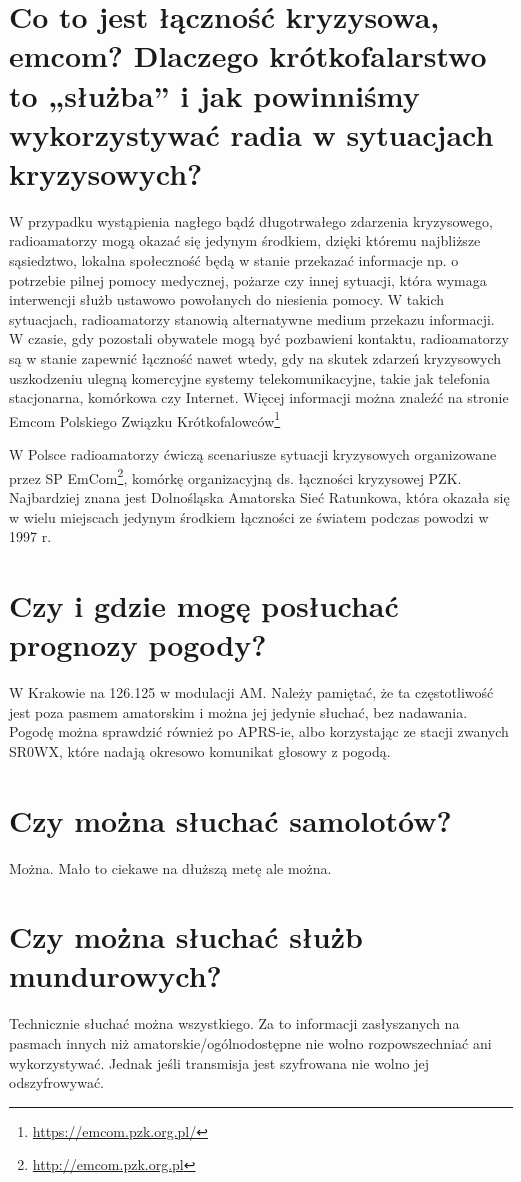 \documentclass[a4paper,12pt]{article}
\begin{document}
\section{Co to jest łączność kryzysowa, emcom? Dlaczego krótkofalarstwo to „służba” i jak powinniśmy wykorzystywać radia w sytuacjach kryzysowych?}
W przypadku wystąpienia nagłego bądź długotrwałego zdarzenia kryzysowego, radioamatorzy mogą okazać się jedynym środkiem, dzięki któremu najbliższe sąsiedztwo, lokalna społeczność będą w stanie przekazać informacje np. o potrzebie pilnej pomocy medycznej, pożarze czy innej sytuacji, która wymaga interwencji służb ustawowo powołanych do niesienia pomocy. W takich sytuacjach, radioamatorzy stanowią alternatywne medium przekazu informacji. W czasie, gdy pozostali obywatele mogą być pozbawieni kontaktu, radioamatorzy są w stanie zapewnić łączność nawet wtedy, gdy na skutek zdarzeń kryzysowych uszkodzeniu ulegną komercyjne systemy telekomunikacyjne, takie jak telefonia stacjonarna, komórkowa czy Internet. Więcej informacji można znaleźć na stronie Emcom Polskiego Związku Krótkofalowców\footnote{\url{https://emcom.pzk.org.pl/}}

W Polsce radioamatorzy ćwiczą scenariusze sytuacji kryzysowych organizowane przez SP EmCom\footnote{\url{http://emcom.pzk.org.pl}}, komórkę organizacyjną ds. łączności kryzysowej PZK. Najbardziej znana jest Dolnośląska Amatorska Sieć Ratunkowa, która okazała się w wielu miejscach jedynym środkiem łączności ze 
światem podczas powodzi w 1997 r.

\section{Czy i gdzie mogę posłuchać prognozy pogody?}
W Krakowie na 126.125 w modulacji AM. Należy pamiętać, że ta częstotliwość jest poza pasmem amatorskim i można jej jedynie słuchać, bez nadawania.
Pogodę można sprawdzić również po APRS-ie, albo korzystając ze stacji zwanych SR0WX, które nadają okresowo komunikat głosowy z pogodą.

\section{Czy można słuchać samolotów?}
Można. Mało to ciekawe na dłuższą metę ale można.

\section{Czy można słuchać służb mundurowych?}
Technicznie słuchać można wszystkiego. Za to informacji zasłyszanych na pasmach innych niż amatorskie/ogólnodostępne nie wolno rozpowszechniać ani wykorzystywać. Jednak jeśli transmisja jest szyfrowana nie wolno jej odszyfrowywać.
\end{document}
